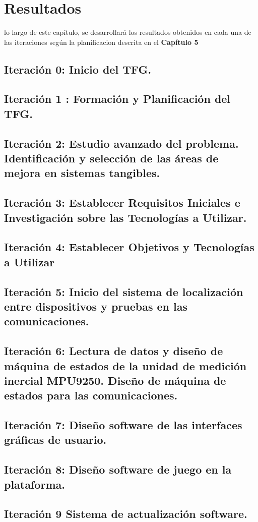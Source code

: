 \chapter{Resultados}
\label{chap:resultados}


 lo largo de este capítulo, se desarrollará los resultados obtenidos en cada una de las iteraciones según la planificacion descrita en el \textbf{Capítulo 5}



\section{Iteración 0: Inicio del TFG.}


\section{Iteración 1 : Formación y Planificación del TFG.}



\section{Iteración 2: Estudio avanzado del problema. Identificación y selección de las áreas de mejora en sistemas tangibles.}




\section{Iteración 3: Establecer Requisitos Iniciales e Investigación sobre las Tecnologías a Utilizar.}



\section{Iteración 4: Establecer Objetivos y Tecnologías a Utilizar}



\section{Iteración 5: Inicio del sistema de localización entre dispositivos y pruebas en las comunicaciones.}




\section{Iteración 6: Lectura de datos y diseño de máquina de estados de la unidad de medición inercial MPU9250. Diseño de máquina de estados para las comunicaciones.}



\section{Iteración 7: Diseño software de las interfaces gráficas de usuario.}


\section{Iteración 8: Diseño software de juego en la plataforma.}


\section{Iteración 9 Sistema de actualización software.}




